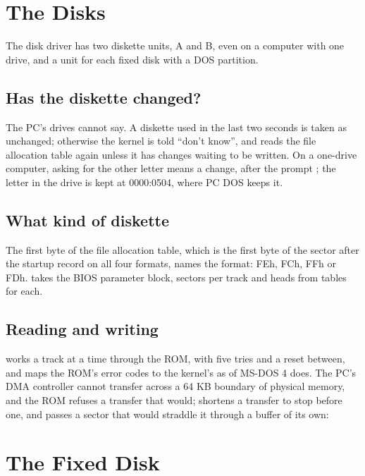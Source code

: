 \section{The Disks}

The disk driver has two diskette units, A and B, even on a computer with
one drive, and a unit for each fixed disk with a DOS partition.

\subsection{Has the diskette changed?} The PC's drives cannot say. A
diskette used in the last two seconds is taken as unchanged; otherwise
the kernel is told ``don't know'', and reads the file allocation table
again unless it has changes waiting to be written. On a one-drive
computer, asking for the other letter means a change, after the prompt
; the
letter in the drive is kept at 0000:0504, where PC DOS keeps it.


\subsection{What kind of diskette} The first byte of the file allocation
table, which is the first byte of the sector after the startup record on
all four formats, names the format: FEh, FCh, FFh or FDh. 
takes the BIOS parameter block, sectors per track and heads from tables
for each.

\subsection{Reading and writing}  works a track at a time
through the ROM, with five tries and a reset between, and maps the ROM's
error codes to the kernel's as  of MS-DOS 4 does. The
PC's DMA controller cannot transfer across a 64 KB boundary of physical
memory, and the ROM refuses a transfer that would; 
shortens a transfer to stop before one, and passes a sector that would
straddle it through a buffer of its own:


\section{The Fixed Disk}

